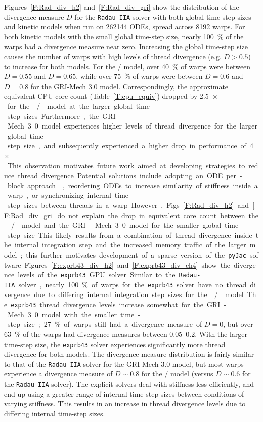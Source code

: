 \documentclass[preprint,review,11pt]{elsarticle}
\begin{document}
Figures~\ref{F:Rad_div_h2} and~\ref{F:Rad_div_gri} show the distribution of the divergence measure $D$ for the \texttt{Radau-IIA} solver with both global time-step sizes and kinetic models when run on \num{262144} ODEs, spread across \num{8192} warps.
For both kinetic models with the small global time-step size, nearly \SI{100}{\percent} of the warps had a divergence measure near zero.
Increasing the global time-step size causes the number of warps with high levels of thread divergence (e.g. $D > 0.5$) to increase for both models.
For the \slash{} model, over \SI{40}{\percent} of warps were between $D=0.55$ and $D=0.65$, while over \SI{75}{\percent} of warps were between $D=0.6$ and $D=0.8$ for the GRI-Mech 3.0 model.
Correspondingly, the approximate equivalent CPU core-count (Table~\ref{T:cpu_equiv}) dropped by \SI{2.5}{$\times$} for the \slash{} model at the larger global time-step sizes.
Furthermore, the GRI-Mech 3.0 model experiences higher levels of thread divergence for the larger global time-step size, and subsequently experienced a higher drop in performance of \SI{4}{$\times$}.
This observation motivates future work aimed at developing strategies to reduce thread divergence.
Potential solutions include adopting an ODE per-block approach~\cite{Stone:2013aa}, reordering ODEs to increase similarity of stiffness inside a warp, or synchronizing internal time-step sizes between threads in a warp.
However, Figs.~\ref{F:Rad_div_h2} and \ref{F:Rad_div_gri} do not explain the drop in equivalent core count between the \slash{} model and the GRI-Mech 3.0 model for the smaller global time-step size.
This likely results from a combination of thread divergence inside the internal integration step and the increased memory traffic of the larger model; this further motivates development of a sparse version of the \texttt{pyJac} software.

Figures~\ref{F:exprb43_div_h2} and \ref{F:exprb43_div_ch4} show the divergence levels of the \texttt{exprb43} GPU solver.
Similar to the \texttt{Radau-IIA} solver, nearly \SI{100}{\percent} of warps for the \texttt{exprb43} solver have no thread divergence due to differing internal integration step sizes for the \slash{} model.
The \texttt{exprb43} thread divergence levels increase somewhat for the GRI-Mech 3.0 model with the smaller time-step size; \SI{27}{\percent} of warps still had a divergence measure of $D=0$, but over \SI{63}{\percent} of the warps had divergence measures between \numrange{0.05}{0.2}.
With the larger time-step size, the \texttt{exprb43} solver experiences significantly more thread divergence for both models.
The divergence measure distribution is fairly similar to that of the \texttt{Radau-IIA} solver for the GRI-Mech 3.0 model, but most warps experience a divergence measure of $D \sim 0.8$ for the \slash{} model (versus $D \sim 0.6$ for the \texttt{Radau-IIA} solver).
The explicit solvers deal with stiffness less efficiently, and end up using a greater range of internal time-step sizes between conditions of varying stiffness.
This results in an increase in thread divergence levels due to differing internal time-step sizes.
\end{document}
